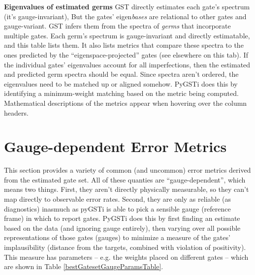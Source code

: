 \documentclass{article}[11pt]
\newcommand{\putfield}[2]{#2}
\begin{document}
{{\begin{table}
  \begin{center}
    \begin{adjustbox}{max width=\textwidth}
      \putfield{bestGermsEvalTable}{}
    \end{adjustbox}
    \caption{\textbf{Eigenvalues of estimated germs}  GST directly estimates each gate's spectrum (it's gauge-invariant), But the gates' eigen\emph{bases} are relational to other gates and gauge-variant.  GST infers them from the spectra of \emph{germs} that incorporate multiple gates.  Each germ's spectrum is gauge-invariant and directly estimatable, and this table lists them.  It also lists metrics that compare these spectra to the ones predicted by the ``eigenspace-projected'' gates (see elsewhere on this tab).  If the individual gates' eigenvalues account for all imperfections, then the estimated and predicted germ spectra should be equal.  Since spectra aren't ordered, the eigenvalues need to be matched up or aligned somehow.  PyGSTi does this by identifying a minimum-weight matching based on the metric being computed.  Mathematical descriptions of the metrics appear when hovering over the column headers.}
  \end{center}
\end{table}
}{}

\section{Gauge-dependent Error Metrics}
This section provides a variety of common (and uncommon) error metrics derived from the estimated gate set.  All of these quanties are ``gauge-dependent'', which means two things.  First, they aren't directly physically measurable, so they can't map directly to observable error rates.  Second, they are only as reliable (as diagnostics) inasmuch as pyGSTi is able to pick a sensible gauge (reference frame) in which to report gates.  PyGSTi does this by first finding an estimate based on the data (and ignoring gauge entirely), then varying over all possible representations of those gates (gauges) to minimize a measure of the gates' implausibility (distance from the targets, combined with violation of positivity).  This measure has parameters -- e.g. the weights placed on different gates -- which are shown in Table \ref{bestGatesetGaugeParamsTable}.

}
\end{document}
